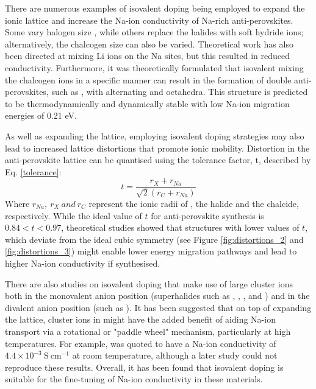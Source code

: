 \documentclass[12pt]{report}
\begin{document}
There are numerous examples of isovalent doping being employed to expand the ionic lattice and increase the Na-ion conductivity of Na-rich anti-perovskites.
Some vary halogen size \cite{wang2015a, ahiavi2020, lin2020, dawson2018c, kim2019, fan2020, lu2020, yin2020}, while others replace the halides with soft hydride ions;\cite{gao2021} alternatively, the chalcogen size can also be varied.\cite{kim2019, yin2020, gao2021}
Theoretical work has also been directed at mixing Li ions on the Na sites, but this resulted in reduced conductivity.\cite{dawson2018c}
Furthermore, it was theoretically formulated that isovalent mixing the chalcogen ions in a specific manner can result in the formation of double anti-perovskites, such as , with alternating  and  octahedra.
This structure is predicted to be thermodynamically and dynamically stable with low Na-ion migration energies of 0.21 eV.\cite{yu2018}

As well as expanding the lattice, employing isovalent doping strategies may also lead to increased lattice distortions that promote ionic mobility.
Distortion in the anti-perovskite lattice can be quantised using the tolerance factor, t, described by Eq. \ref{tolerance}:
\begin{equation}
    t = \frac{r_X + r_{Na}}{\sqrt{2}(r_C + r_{Na})}
\label{tolerance}
\end{equation}
Where $r_{Na}, \ r_X \ and \ r_C$ represent the ionic radii of , the halide and the chalcide, respectively. 
While the ideal value of $t$ for anti-perovskite synthesis is $0.84 < t < 0.97$, theoretical studies showed that structures with lower values of $t$, which deviate from the ideal cubic symmetry (see Figure \ref{fig:distortions_2} and \ref{fig:distortions_3}) might enable lower energy migration pathways and lead to higher Na-ion conductivity if synthesised.\cite{kim2019, avdontceva2015, pham2018}

There are also studies on isovalent doping that make use of large cluster ions both in the monovalent anion position (superhalides such as , , ,  and )\cite{ahiavi2020, sun2019, gao2020, fang2018} and in the divalent anion position (such as ).\cite{fan2020, avdontceva2015}
It has been suggested that on top of expanding the lattice, cluster ions in might have the added benefit of aiding Na-ion transport via a rotational or "paddle wheel" mechanism, particularly at high temperatures. \cite{jansen1991}
For example,  was quoted to have a Na-ion conductivity of  $4.4 \times 10^{-3} \ \mathrm{S \ cm^{-1}}$ at room temperature\cite{sun2019}, although a later study could not reproduce these results.\cite{ahiavi2020}
Overall, it has been found that isovalent doping is suitable for the fine-tuning of Na-ion conductivity in these materials.
\end{document}
